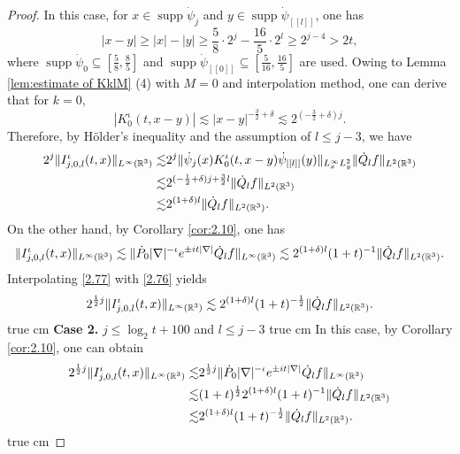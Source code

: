 \documentclass[11pt,twoside]{article}
\def\R{\mathop{\mathbb R\kern 0pt}\nolimits}
\def\f{\frac}
\def\ls{\lesssim}
\newcommand{\q}{\dot{Q}}
\DeclareMathOperator{\supp}{supp}
\theoremstyle{plain}
\theoremstyle{definition}
\numberwithin{equation}{section}
\begin{document}
\begin{proof}
		In this case, for $x\in\supp \dot{\psi}_j$ and $y\in\supp \dot{\psi}_{[[l]]}$, one has
		\begin{equation*}
			|x-y|\ge|x|-|y|\ge {\f{5}{8}}\cdot2^j-\f{16}{5}\cdot2^l\ge2^{j-4}>2t,
		\end{equation*}
		where $\supp\dot{\psi}_0\subseteq [\f{5}{8},\f{8}{5}]$ and $\supp\dot{\psi}_{[[0]]}\subseteq[\f{5}{16},\f{16}{5}]$ are used.
Owing to Lemma \ref{lem:estimate of KklM} (4) with $M=0$ and interpolation method,
one can derive that for $k=0$,
		\begin{equation*}
			|K^\iota_0(t,x-y)|\ls |x-y|^{-\f32+\delta}\ls 2^{(-\f32+\delta)j}.
		\end{equation*}
		Therefore, by H\"{o}lder's inequality and the assumption of $l\le j-3$, we have
		\begin{equation}\label{2.76}
			\begin{split}
				2^{j}\|I_{j,0,l}^\iota(t,x)\|_{L^\infty(\R^3)}
				\ls&
				2^{j}\|\dot{\psi}_j(x)K^\iota_0(t,x-y)\dot{\psi}_{[[l]]}(y)\|_{L^\infty_xL^2_y}\|\q_lf\|_{L^2(\R^3)}\\
				\ls&
				2^{(-\f12+\delta)j+\f32 l}\|\q_lf\|_{L^2(\R^3)}\\
				\ls&
				2^{(1+\delta) l}\|\q_lf\|_{L^2(\R^3)}.
			\end{split}
		\end{equation}
		On the other hand, by Corollary \ref{cor:2.10}, one has
		\begin{equation}\label{2.77}
			\|I_{j,0,l}^\iota(t,x)\|_{L^\infty(\R^3)}
			\ls
			\|\dot{P}_{0}|\nabla|^{-\iota} e^{\pm it|\nabla|}\q_lf\|_{L^\infty(\R^3)}
			\ls
			2^{ (1+\delta) l}(1+t)^{-1}\|\q_lf\|_{L^2(\R^3)}.
		\end{equation}
		Interpolating \eqref{2.77} with \eqref{2.76} yields
		\begin{equation}\label{2.78}
			2^{\f12 j}\|I_{j,0,l}^\iota(t,x)\|_{L^\infty(\R^3)}\ls  2^{ (1+\delta)l}(1+t)^{-\f12}\|\q_lf\|_{L^2(\R^3)}.
		\end{equation}
 true cm
		\noindent\textbf{Case 2.} $j\le \log_2t+100$ and $l\le j-3$
 true cm
		In this case, by Corollary \ref{cor:2.10}, one can obtain
		\begin{equation}\label{2.79}
			\begin{split}
				2^{\f12 j}\|I_{j,0,l}^\iota(t,x)\|_{L^\infty(\R^3)}
				\ls&	2^{\f12 j}\|\dot{P}_0 |\nabla|^{-\iota} e^{\pm it|\nabla|} \q_lf\|_{L^\infty(\R^3)}\\
				\ls& (1+ t)^{\f12}2^{(1+\delta)l}(1+ t)^{-1}\|\q_lf\|_{L^2(\R^3)}\\
				\ls &2^{(1+\delta)l}(1+ t)^{-\f12}\|\q_lf\|_{L^2(\R^3)}.
			\end{split}
		\end{equation}
 true cm


\end{proof}
\end{document}
